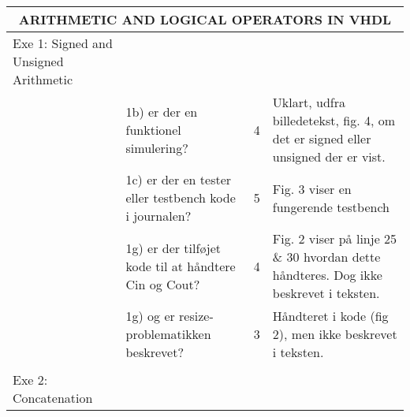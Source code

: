 \begin{table}[h]
    \small
    \begin{tabularx}{\textwidth}{p{3.5cm}Xp{5mm}X}

        \toprule
        \multicolumn{4}{c}{ARITHMETIC AND LOGICAL OPERATORS IN VHDL}                                                                                                                                                                                              \\\midrule
        Exe 1: Signed and Unsigned Arithmetic &                                                                                                     &   &                                                                                                         \\
                                              & 1b) er der en funktionel simulering?                                                                & 4 & Uklart, udfra billedetekst, fig. 4, om det er signed eller unsigned der er vist.                        \\
                                              & 1c) er der en tester eller testbench kode i journalen?                                              & 5 & Fig. 3 viser en fungerende testbench                                                                    \\
                                              & 1g) er der tilføjet kode til at håndtere Cin og Cout?                                               & 4 & Fig. 2 viser på linje 25 \& 30 hvordan dette håndteres. Dog ikke beskrevet i teksten.                   \\
                                              & 1g) og er resize-problematikken beskrevet?                                                          & 3 & Håndteret i kode (fig 2), men ikke beskrevet i teksten.                                                 \\
                                              &                                                                                                     &   &                                                                                                         \\ \midrule
        Exe 2: Concatenation                  &                                                                                                     &   &                                                                                                         \\

\end{tabularx}
\end{table}
